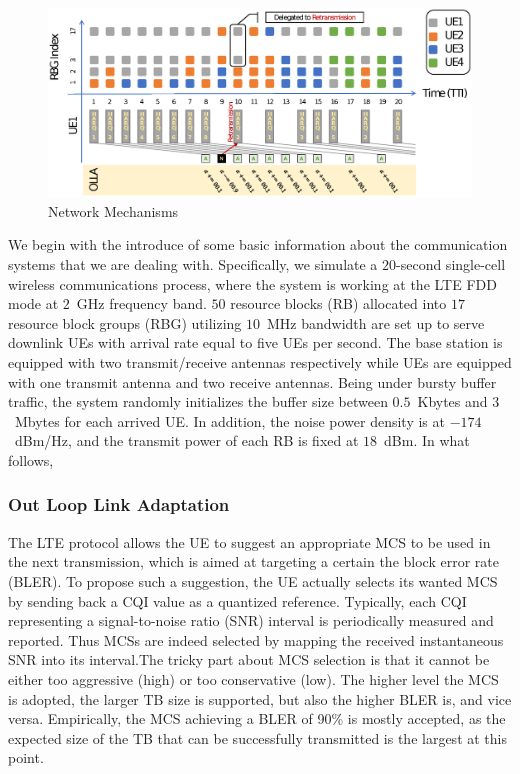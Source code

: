 \documentclass[conference,compsocconf]{IEEEtran}
\begin{document}
\begin{figure}
	\centering
	\includegraphics[width=1\linewidth]{Figs/system.eps}
	\caption{Network Mechanisms}
	\label{sys}
\end{figure}

We begin with the introduce of some basic information about the communication systems that we are dealing with. Specifically, we simulate a $20$-second single-cell wireless communications process, where the system is working at the LTE FDD mode at $2$~GHz frequency band. $50$ resource blocks (RB) allocated into $17$ resource block groups (RBG) utilizing $10$~MHz bandwidth are set up to serve downlink UEs with arrival rate equal to five UEs per second. The base station is equipped with two transmit/receive antennas respectively while UEs are equipped with one transmit antenna and two receive antennas. Being under bursty buffer traffic, the system randomly initializes the buffer size between $0.5$~Kbytes and $3$~Mbytes for each arrived UE. In addition, the noise power density is at $-174$~dBm/Hz, and the transmit power of each RB is fixed at $18$~dBm. In what follows, 

\subsubsection{Out Loop Link Adaptation}
The LTE protocol allows	the UE to suggest an appropriate MCS to be used in the next transmission, which is aimed at targeting a certain the block error rate (BLER). To propose such a suggestion, the UE actually selects its wanted MCS by sending back a CQI value as a quantized reference. Typically, each CQI representing a signal-to-noise ratio (SNR) interval is periodically measured and reported. Thus MCSs are indeed selected by mapping the received instantaneous SNR into its interval.The tricky part about MCS selection is that it cannot be either too aggressive (high) or too conservative (low). The higher level the MCS is adopted, the larger TB size is supported, but also the higher BLER is, and vice versa. Empirically, the MCS achieving a BLER of 90\% is mostly accepted, as the expected size of the TB that can be successfully transmitted is the largest at this point. 
\end{document}
